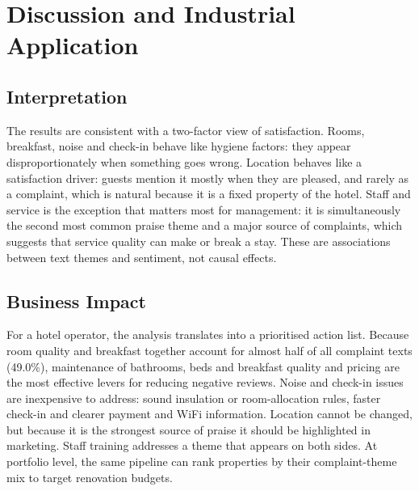 \documentclass[11pt,journal,draftclsnofoot,onecolumn]{IEEEtran}
\begin{document}
\section{Discussion and Industrial Application}
\subsection{Interpretation}
The results are consistent with a two-factor view of satisfaction. Rooms, breakfast, noise and check-in behave like hygiene factors: they appear disproportionately when something goes wrong. Location behaves like a satisfaction driver: guests mention it mostly when they are pleased, and rarely as a complaint, which is natural because it is a fixed property of the hotel. Staff and service is the exception that matters most for management: it is simultaneously the second most common praise theme and a major source of complaints, which suggests that service quality can make or break a stay. These are associations between text themes and sentiment, not causal effects.

\subsection{Business Impact}
For a hotel operator, the analysis translates into a prioritised action list. Because room quality and breakfast together account for almost half of all complaint texts (49.0\%), maintenance of bathrooms, beds and breakfast quality and pricing are the most effective levers for reducing negative reviews. Noise and check-in issues are inexpensive to address: sound insulation or room-allocation rules, faster check-in and clearer payment and WiFi information. Location cannot be changed, but because it is the strongest source of praise it should be highlighted in marketing. Staff training addresses a theme that appears on both sides. At portfolio level, the same pipeline can rank properties by their complaint-theme mix to target renovation budgets.
\end{document}
